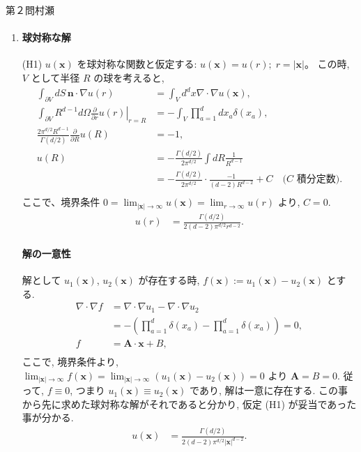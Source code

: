 \begin{answer}{第２問}{村瀬}
\begin{enumerate}
\begin{enumerate}
  \end{enumerate}

\item{}
  \paragraph{球対称な解}
  (H1) $u(\bm{x})$ を球対称な関数と仮定する: $u(\bm{x}) =u(r);\; r = |\bm{x}|$。
  この時, $V$ として半径 $R$ の球を考えると,
  \begin{align*}
    \int_{\partial V} dS\,\bm{n}\cdot\nabla u(r) &= \int_{V} d^dx \nabla\cdot\nabla u(\bm{x}),\\
    \int_{\partial V} R^{d-1} d\Omega \left. \frac{\partial}{\partial r} u(r) \right|_{r=R}
      &= -\int_{V} \prod_{a=1}^d dx_a \delta(x_a),\\
    \frac{2\pi^{d/2}R^{d-1}}{\Gamma(d/2)}\frac{\partial}{\partial R} u(R) &= -1,\\
    u(R)
      &= -\frac{\Gamma(d/2)}{2\pi^{d/2}} \int dR \frac1{R^{d-1}}\\
      &= -\frac{\Gamma(d/2)}{2\pi^{d/2}}\cdot \frac{-1}{(d-2)R^{d-2}} + C \quad\text{($C$ 積分定数)}.\\
  \end{align*}
  ここで、境界条件 $0 = \lim_{|\bm{x}|\to\infty} u(\bm{x}) = \lim_{r\to\infty} u(r)$ より, $C=0$.
  \begin{align*}
    u(r)
      &= \frac{\Gamma(d/2)}{2(d-2)\pi^{d/2} r^{d-2}}.
  \end{align*}

  \paragraph{解の一意性}
  解として $u_1(\bm x)$, $u_2(\bm x)$ が存在する時,
  $f(\bm x) :=u_1(\bm x) - u_2(\bm x)$ とする.
  \begin{align*}
  \nabla\cdot\nabla f
    &= \nabla\cdot\nabla u_1 - \nabla\cdot\nabla u_2\\
    &= -(\prod_{a=1}^d \delta(x_a) - \prod_{a=1}^d \delta(x_a)) = 0,\\
  f &= \bm A \cdot \bm x  + B,\\
  \end{align*}
  ここで, 境界条件より,
  $\lim_{|\bm{x}|\to\infty} f(\bm x)
  = \lim_{|\bm{x}|\to\infty} (u_1(\bm x) - u_2(\bm{x})) = 0$ より $\bm{A} = B = 0$.
  従って, $f\equiv0$, つまり $u_1(\bm x) \equiv u_2(\bm{x})$ であり, 解は一意に存在する.
  この事から先に求めた球対称な解がそれであると分かり,
  仮定 (H1) が妥当であった事が分かる.
  \begin{align*}
    u(\bm{x}) &= \frac{\Gamma(d/2)}{2(d-2)\pi^{d/2} |\bm{x}|^{d-2}}.
  \end{align*}

\end{enumerate}
\end{answer}
